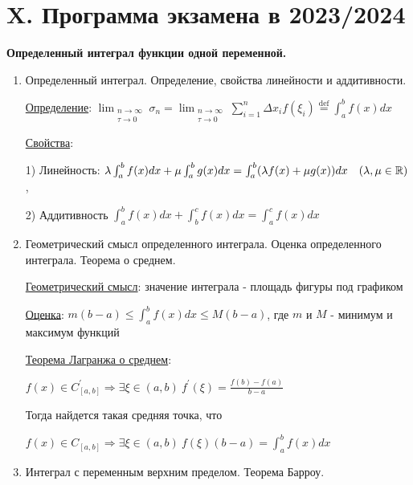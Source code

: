 \documentclass[12pt]{article}
\begin{document}
    \clearpage

    \section{X. Программа экзамена в 2023/2024}

    \begin{center}
        \textbf{Определенный интеграл функции одной переменной.}
    \end{center}

    \begin{enumerate}
        \item Определенный интеграл. Определение, свойства линейности и аддитивности.

        \hyperlink{integraldefinition}{Определение}: $\lim_{\substack{n\to\infty \\ \tau\to0}} \sigma_n = \lim_{\substack{n\to\infty \\ \tau\to0}} \sum^n_{i=1} \Delta x_i f(\xi_i) \stackrel{\text{def}}{=} \int_a^b f(x)dx$

        \hyperlink{integralproperties}{Свойства}:

        1) Линейность: $\lambda \int^b_a f(x)dx + \mu \int^b_a g(x)dx = \int^b_a (\lambda f(x) + \mu g(x)) dx \quad (\lambda, \mu \in \mathbb{R})$,

        2) Аддитивность $\int^b_a f(x)dx + \int^c_b f(x)dx = \int^c_a f(x)dx$

        \item Геометрический смысл определенного интеграла. Оценка определенного интеграла. Теорема о среднем.

        \hyperlink{integralgeommeaning}{Геометрический смысл}: значение интеграла - площадь фигуры под графиком

        \hyperlink{integralevaluation}{Оценка}: $m (b-a) \leq \int^b_a f(x)dx \leq M(b - a)$, где $m$ и $M$ - минимум и максимум функций

        \hyperlink{theoremlagrangeaboutaverage}{Теорема Лагранжа о среднем}:

        $f(x) \in C^\prime_{[a,b]} \Longrightarrow \exists \xi \in (a, b) \ f^\prime(\xi) = \frac{f(b) - f(a)}{b - a}$

        Тогда найдется такая средняя точка, что

        $f(x) \in C_{[a,b]} \Longrightarrow \exists \xi \in (a, b) \ f(\xi)(b - a) = \int^b_a f(x)dx$


        \item Интеграл с переменным верхним пределом. Теорема Барроу.


\end{enumerate}
\end{document}
